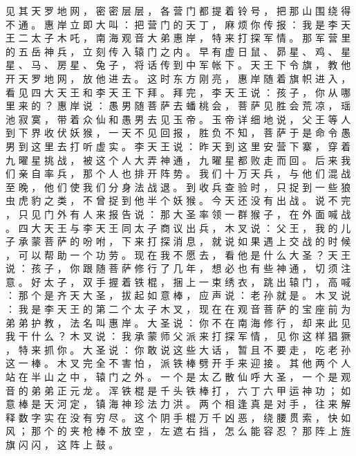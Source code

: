 {见 其 天 罗 地 网 ， 密 密 层 层 ， 各 营 门 都 提 着 铃 号 ， 把 那 山 围 绕 得 不 通 。
惠 岸 立 即 大 叫 ： 把 营 门 的 天 丁 ， 麻 烦 你 传 报 ： 我 是 李 天 王 二 太 子 木 吒 ， 南 海 观 音 大 弟 惠 岸 ， 特 来 打 探 军 情 。
那 军 营 里 的 五 岳 神 兵 ， 立 刻 传 入 辕 门 之 内 。
早 有 虚 日 鼠 、 昴 星 、 鸡 、 星 星 、 马 、 房 星 、 兔 子 ， 将 话 传 到 中 军 帐 下 。
天 王 下 令 旗 ， 教 他 开 天 罗 地 网 ， 放 他 进 去 。
这 时 东 方 刚 亮 ， 惠 岸 随 着 旗 帜 进 入 ， 看 见 四 大 天 王 和 李 天 王 下 拜 。
拜 完 ， 李 天 王 说 ： 孩 子 ， 你 从 哪 里 来 的 ？ 惠 岸 说 ： 愚 男 随 菩 萨 去 蟠 桃 会 ， 菩 萨 见 胜 会 荒 凉 ， 瑶 池 寂 寞 ， 带 着 众 仙 和 愚 男 去 见 玉 帝 。
玉 帝 详 细 地 说 ， 父 王 等 人 到 下 界 收 伏 妖 猴 ， 一 天 不 见 回 报 ， 胜 负 不 知 ， 菩 萨 于 是 命 令 愚 男 到 这 里 去 打 听 虚 实 。
李 天 王 说 ： 昨 天 到 这 里 安 营 下 寨 ， 穿 着 九 曜 星 挑 战 ， 被 这 个 人 大 弄 神 通 ， 九 曜 星 都 败 走 而 回 。
后 来 我 们 亲 自 率 兵 ， 那 个 人 也 排 开 阵 势 。
我 们 十 万 天 兵 ， 与 他 们 混 战 至 晚 ， 他 们 使 我 们 分 身 法 战 退 。
到 收 兵 查 验 时 ， 只 捉 到 一 些 狼 虫 虎 豹 之 类 ， 不 曾 捉 到 他 半 个 妖 猴 。
今 天 还 没 有 出 战 。
说 不 完 ， 只 见 门 外 有 人 来 报 告 说 ： 那 大 圣 率 领 一 群 猴 子 ， 在 外 面 喊 战 。
四 大 天 王 与 李 天 王 同 太 子 商 议 出 兵 ， 木 叉 说 ： 父 王 ， 我 的 儿 子 承 蒙 菩 萨 的 吩 咐 ， 下 来 打 探 消 息 ， 就 说 如 果 遇 上 交 战 的 时 候 ， 可 以 帮 助 一 个 功 劳 。
现 在 我 不 愿 去 ， 看 他 是 什 么 大 圣 ？
天 王 说 ： 孩 子 ， 你 跟 随 菩 萨 修 行 了 几 年 ， 想 必 也 有 些 神 通 ， 切 须 注 意 。
好 太 子 ， 双 手 握 着 铁 棍 ， 捆 上 一 束 绣 衣 ， 跳 出 辕 门 ， 高 喊 ： 那 个 是 齐 天 大 圣 ， 拔 起 如 意 棒 ， 应 声 说 ： 老 孙 就 是 。
木 叉 说 ： 我 是 李 天 王 的 第 二 个 太 子 木 叉 ， 现 在 在 观 音 菩 萨 的 宝 座 前 为 弟 弟 护 教 ， 法 名 叫 惠 岸 。
大 圣 说 ： 你 不 在 南 海 修 行 ， 却 来 此 见 我 干 什 么 ？ 木 叉 说 ： 我 承 蒙 师 父 派 来 打 探 军 情 ， 见 你 这 样 猖 獗 ， 特 来 抓 你 。
大 圣 说 ： 你 敢 说 这 些 大 话 ， 暂 且 不 要 走 ， 吃 老 孙 这 一 棒 。
木 叉 完 全 不 害 怕 ， 派 铁 棒 劈 开 手 来 迎 接 。
其 他 两 个 人 站 在 半 山 之 中 ， 辕 门 之 外 。
一 个 是 太 乙 散 仙 呼 大 圣 ， 一 个 是 观 音 的 弟 弟 正 元 龙 。
浑 铁 棍 是 千 头 铁 棒 打 ， 六 丁 六 甲 运 神 功 ； 如 意 棒 是 天 河 定 ， 镇 海 神 珍 法 力 洪 。
两 个 相 逢 真 是 对 手 ， 往 来 解 释 数 字 实 在 没 有 穷 尽 。
这 个 阴 手 棍 万 千 凶 恶 ， 绕 腰 贯 索 ， 快 如 风 ； 那 个 的 夹 枪 棒 不 放 空 ， 左 遮 右 挡 ， 怎 么 能 容 忍 ？
那 阵 上 旌 旗 闪 闪 ， 这 阵 上 鼓 。
}
